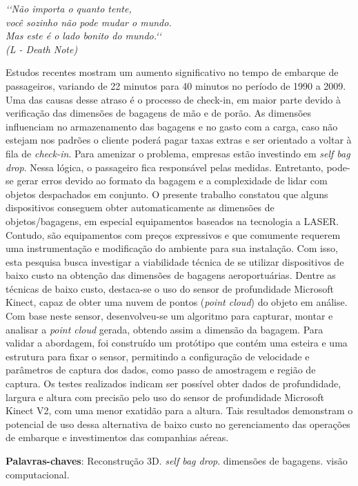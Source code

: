 \begin{epigrafe}
    \vspace*{\fill}
    \begin{flushright}
        \textit{‘‘Não importa o quanto tente, \\ você sozinho não pode mudar o mundo.\\  Mas este é o lado bonito do mundo.‘‘\\
        (L - Death Note)}
    \end{flushright}
\end{epigrafe}



\begin{resumo}
Estudos recentes mostram um aumento significativo no tempo de embarque de passageiros, variando de 22 minutos para 40 minutos no período de 1990 a 2009. Uma das causas desse atraso é o processo de check-in, em maior parte devido à verificação das dimensões de bagagens de mão e de porão. As dimensões influenciam no armazenamento das bagagens e no gasto com a carga, caso não estejam nos padrões o cliente poderá pagar taxas extras e ser orientado a voltar à fila de \textit{check-in}. 
Para amenizar o problema, empresas estão investindo em \textit{self bag drop}. Nessa lógica, o passageiro fica responsável pelas medidas. Entretanto, pode-se gerar erros devido ao formato da bagagem e a complexidade de lidar com objetos despachados em conjunto. O presente trabalho constatou que alguns dispositivos conseguem obter automaticamente as dimensões de objetos/bagagens, em especial equipamentos baseados na tecnologia a LASER. Contudo, são equipamentos com preços expressivos e que comumente requerem uma instrumentação e modificação do ambiente para sua instalação. Com isso, esta pesquisa busca investigar a viabilidade técnica de se utilizar dispositivos de baixo custo na obtenção das dimensões de bagagens aeroportuárias.
Dentre as técnicas de baixo custo, destaca-se o uso do sensor de profundidade Microsoft Kinect, capaz de obter uma nuvem de pontos (\textit{point cloud}) do objeto em análise. Com base neste sensor, desenvolveu-se um algoritmo para capturar, montar e analisar a \textit{point cloud} gerada, obtendo assim a dimensão da bagagem. 
Para validar a abordagem, foi construído um protótipo que contém uma esteira e uma estrutura para fixar o sensor, permitindo a configuração de velocidade e parâmetros de captura dos dados, como passo de amostragem e região de captura. 
Os testes realizados indicam ser possível obter dados de profundidade, largura e altura com precisão pelo uso do sensor de profundidade Microsoft Kinect V2, com uma menor exatidão para a altura. Tais resultados demonstram o potencial de uso dessa alternativa de baixo custo no gerenciamento das operações de embarque e investimentos das companhias aéreas.


    \vspace{\onelineskip}
    \noindent
    \textbf{Palavras-chaves}: Reconstrução 3D. \textit{self bag drop}. dimensões de bagagens. visão computacional.
\end{resumo}


